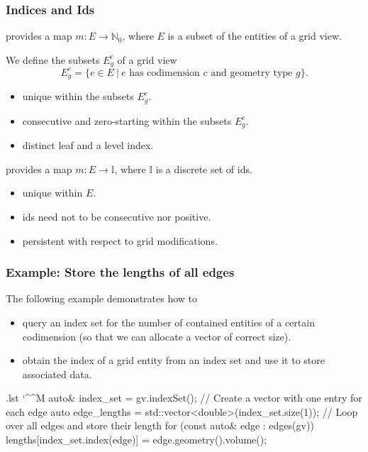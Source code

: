 \documentclass[ignorenonframetext,11pt]{beamer}
\makeatletter
\theoremstyle{definition}
\newenvironment{codeblock}{%
  \begin{tcolorbox}[size=small,oversize,boxrule=0pt,colframe=white]}{%
  \end{tcolorbox}}
\newenvironment{cppcode}{%
  \begingroup
  \@bsphack
  \immediate\openout\lstvrb@out\jobname.lst
  \let\do\@makeother\dospecials\catcode`\^^M\active
  \def\verbatim@processline{%
    \immediate\write\lstvrb@out{\the\verbatim@line}}%
  \verbatim@start}{%
  \immediate\closeout\lstvrb@out
  \@esphack
  \endgroup
  \begin{codeblock}
    
  \end{codeblock}}
\makeatother
\begin{document}
\begin{frame}
  \frametitle{Indices and Ids}

  provides a map $m : E \to \mathbb{N}_0$,
  where $E$ is a subset of the entities of a grid view.

  We define the subsets $E_g^c$ of a grid view
  \[ E_g^c = \{e\in E \ | \ \textrm{$e$ has codimension $c$ and geometry type $g$} \}.\]

  \begin{itemize}
  \item unique within the subsets $E_g^c$.
  \item consecutive and zero-starting within the subsets $E_g^c$.
  \item distinct leaf and a level index.
  \end{itemize}

  \pause
  provides a map $m : E \to \mathbb{I}$, where $\mathbb{I}$ is a discrete
  set of ids.

  \begin{itemize}
  \item unique within $E$.
  \item ids need not to be consecutive nor positive.
  \item persistent with respect to grid modifications.
  \end{itemize}

\end{frame}

\begin{frame}[fragile]
  \frametitle{Example: Store the lengths of all edges}
  The following example demonstrates how to
  \begin{itemize}
  \item query an index set for the number of contained
    entities of a certain codimension (so that we can allocate a vector of correct size).
  \item obtain the index of a grid entity from an index set and use it to store associated data.
  \end{itemize}
  \begin{cppcode}
auto& index_set = gv.indexSet();
// Create a vector with one entry for each edge
auto edge_lengths = std::vector<double>(index_set.size(1));
// Loop over all edges and store their length
for (const auto& edge : edges(gv))
  lengths[index_set.index(edge)] = edge.geometry().volume();
\end{cppcode}
\end{frame}
\end{document}
